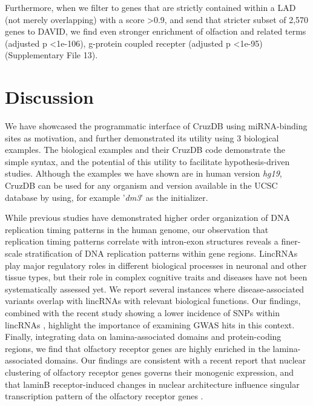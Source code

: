 \documentclass{bioinfo}
\begin{document}
Furthermore, when we filter to genes that are strictly contained within a LAD (not merely overlapping) with a score \textgreater 0.9, and send that stricter subset of 2,570 genes to DAVID, we find even stronger enrichment of olfaction and related terms (adjusted p \textless  1e-106), g-protein coupled recepter (adjusted p \textless  1e-95) (Supplementary File 13).




\section{Discussion}

We have showcased the programmatic interface of CruzDB using miRNA-binding sites as motivation, and further demonstrated its utility using 3 biological examples.
The biological examples and their CruzDB code demonstrate the simple syntax, and the potential of this utility to facilitate hypothesis-driven studies. Although the examples we have shown are in human version \textit{hg19}, CruzDB can be used for any organism and version available in the UCSC database by using, for example '\textit{dm3}' as the initializer.

While previous studies have demonstrated higher order organization of DNA replication timing patterns in the human genome, our observation that replication timing patterns correlate with intron-exon structures reveals a finer-scale stratification of DNA replication patterns within gene regions. LincRNAs play major regulatory roles in different biological processes in neuronal and other tissue types, but their role in complex cognitive traits and diseases have not been systematically assessed yet. We report several instances where disease-associated variants overlap with lincRNAs with relevant biological functions. Our findings, combined with the recent study showing a lower incidence of SNPs within lincRNAs \citep{Chen}, highlight the importance of examining GWAS hits in this context. Finally, integrating data on lamina-associated domains and protein-coding regions, we find that olfactory receptor genes are highly enriched in the lamina-associated domains. Our findings are consistent with a recent report that nuclear clustering of olfactory receptor genes governs their monogenic expression, and that laminB receptor-induced changes in nuclear architecture influence singular transcription pattern of the olfactory receptor genes \citep{Clowney}. 
\end{document}
